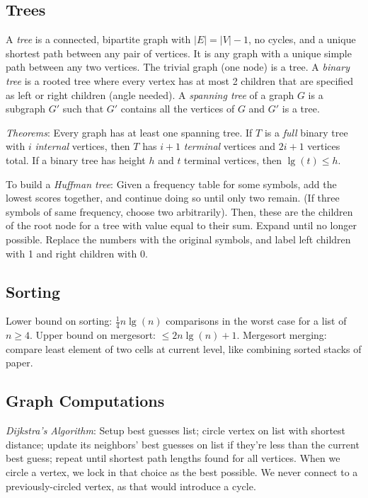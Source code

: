 \documentclass[10pt,letterpaper,twocolumn]{article}
\begin{document}
\subsection{Trees} 

A \emph{tree} is a connected, bipartite graph with 
$ |E| = |V| - 1 $, no cycles, and a unique shortest
path between any pair of vertices. It is any graph 
with a unique simple path between any two vertices.
The trivial graph (one node) is a tree. 
A \emph{binary tree} is a rooted tree where every
vertex has at most 2 children that are specified
as left or right children (angle needed). 
A \emph{spanning tree} of a graph $ G $ is a
subgraph $ G' $ such that $ G' $ contains all the
vertices of $ G $ and $ G' $ is a tree. 

\emph{Theorems}: Every graph has at least 
one spanning tree. If $ T $ is a 
\emph{full} binary tree with 
$ i $ \emph{internal} vertices, then 
$ T $ has $ i + 1  $ \emph{terminal} vertices 
and $ 2i + 1 $ vertices total. 
If a binary tree has height $ h $ and $ t $ terminal 
vertices, then $ \lg(t) \le h $. 

To build a \emph{Huffman tree}:
Given a frequency table for some symbols, 
add the lowest scores together, and continue
doing so until only two remain. (If three symbols
of same frequency, choose two arbitrarily). 
Then, these are the children of the root node 
for a tree with value equal to their sum. 
Expand until no longer possible. Replace the 
numbers with the original symbols, and label 
left children with 1 and right children with 0. 


\subsection{Sorting} 

Lower bound on sorting: $ \frac{1}{4}n\lg(n) $ 
comparisons in the worst case for a list of 
$ n \ge 4 $. Upper bound on mergesort: 
$ \le 2n\lg(n) + 1 $. Mergesort merging: compare
least element of two cells at current level, like
combining sorted stacks of paper. 


\subsection{Graph Computations} 

\emph{Dijkstra's Algorithm}: Setup best guesses list; 
circle vertex on list with shortest distance; 
update its neighbors' best guesses on list
if they're less than the current best guess; 
repeat until shortest path lengths found for 
all vertices. When we circle a vertex, we lock in 
that choice as the best possible. We never connect
to a previously-circled vertex, as that would 
introduce a cycle.
\end{document}
